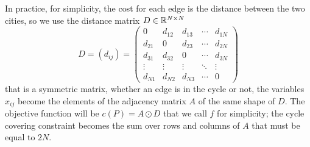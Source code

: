 In practice, for simplicity, the cost for each edge is the distance between the two cities, so we use the distance matrix $D\in\mathbb{R}^{N\times N}$
\[
D=(d_{ij})=
\begin{pmatrix} 
	0 & d_{12} & d_{13} & \cdots & d_{1N} \\
	d_{21} & 0 & d_{23} & \cdots & d_{2N} \\
	d_{31} & d_{32} & 0 & \cdots & d_{3N} \\
	\vdots & \vdots & \vdots & \ddots & \vdots \\
	d_{N1} & d_{N2} & d_{N3} & \cdots & 0
\end{pmatrix}
\]
that is a symmetric matrix, whether an edge is in the cycle or not, the variables $x_{ij}$ become the elements of the adjacency matrix $A$ of the same shape of $D$. The objective function will be $c(P)=A\odot D$ that we call $f$ for simplicity; the cycle covering constraint becomes the sum over rows and columns of $A$ that must be equal to $2N$.






%
%


